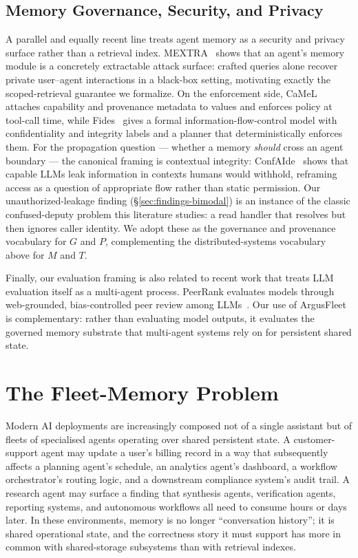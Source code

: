 \documentclass[10pt,twocolumn,letterpaper]{article}
\begin{document}
\subsection{Memory Governance, Security, and Privacy}

A parallel and equally recent line treats agent memory as a security and privacy surface rather than a retrieval index. MEXTRA~\citep{mextra2025} shows that an agent's memory module is a concretely extractable attack surface: crafted queries alone recover private user--agent interactions in a black-box setting, motivating exactly the scoped-retrieval guarantee we formalize. On the enforcement side, CaMeL~\citep{camel2025} attaches capability and provenance metadata to values and enforces policy at tool-call time, while Fides~\citep{fides2025} gives a formal information-flow-control model with confidentiality and integrity labels and a planner that deterministically enforces them. For the propagation question --- whether a memory \emph{should} cross an agent boundary --- the canonical framing is contextual integrity: ConfAIde~\citep{confaide2024} shows that capable LLMs leak information in contexts humans would withhold, reframing access as a question of appropriate flow rather than static permission. Our unauthorized-leakage finding (\S\ref{sec:findings-bimodal}) is an instance of the classic confused-deputy problem this literature studies: a read handler that resolves but then ignores caller identity. We adopt these as the governance and provenance vocabulary for \(G\) and \(P\), complementing the distributed-systems vocabulary above for \(M\) and \(T\).

Finally, our evaluation framing is also related to recent work that treats LLM evaluation itself as a multi-agent process. PeerRank evaluates models through web-grounded, bias-controlled peer review among LLMs~\citep{margalit2026peerrankautonomousllmevaluation}. Our use of ArgusFleet is complementary: rather than evaluating model outputs, it evaluates the governed memory substrate that multi-agent systems rely on for persistent shared state.

\section{The Fleet-Memory Problem}
\label{sec:problem}

Modern AI deployments are increasingly composed not of a single assistant but of fleets of specialised agents operating over shared persistent state. A customer-support agent may update a user's billing record in a way that subsequently affects a planning agent's schedule, an analytics agent's dashboard, a workflow orchestrator's routing logic, and a downstream compliance system's audit trail. A research agent may surface a finding that synthesis agents, verification agents, reporting systems, and autonomous workflows all need to consume hours or days later. In these environments, memory is no longer ``conversation history''; it is shared operational state, and the correctness story it must support has more in common with shared-storage subsystems than with retrieval indexes.
\end{document}
